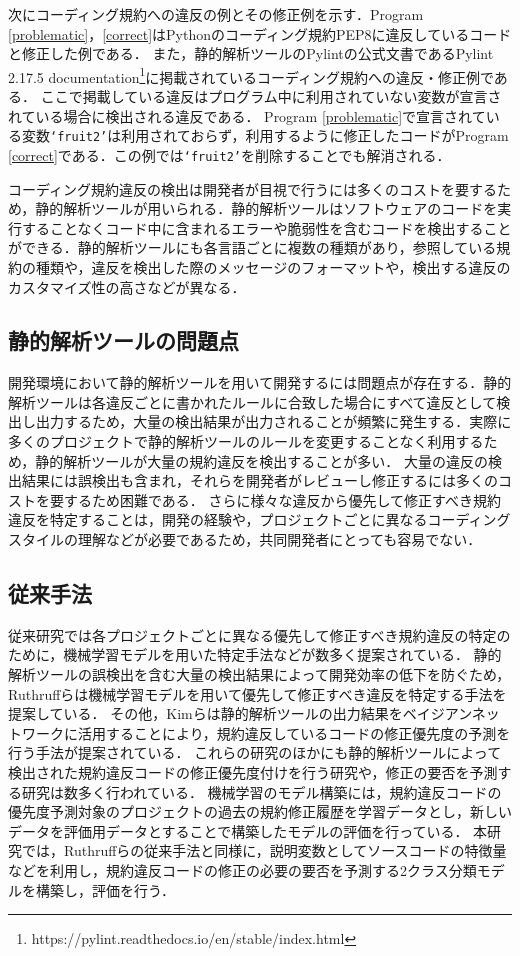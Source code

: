 \documentclass[submit,noauthor,dvipdfmx]{ipsj}
\begin{document}
次にコーディング規約への違反の例とその修正例を示す．Program \ref{problematic}，\ref{correct}はPythonのコーディング規約PEP8に違反しているコードと修正した例である．
また，静的解析ツールのPylintの公式文書であるPylint 2.17.5 documentation\footnote{https://pylint.readthedocs.io/en/stable/index.html}に掲載されているコーディング規約への違反・修正例である．
ここで掲載している違反はプログラム中に利用されていない変数が宣言されている場合に検出される違反である．
Program \ref{problematic}で宣言されている変数\texttt{`fruit2'}は利用されておらず，利用するように修正したコードがProgram \ref{correct}である．この例では\texttt{`fruit2'}を削除することでも解消される．

コーディング規約違反の検出は開発者が目視で行うには多くのコストを要するため，静的解析ツールが用いられる．静的解析ツールはソフトウェアのコードを実行することなくコード中に含まれるエラーや脆弱性を含むコードを検出することができる．静的解析ツールにも各言語ごとに複数の種類があり，参照している規約の種類や，違反を検出した際のメッセージのフォーマットや，検出する違反のカスタマイズ性の高さなどが異なる．

\subsection{静的解析ツールの問題点}

開発環境において静的解析ツールを用いて開発するには問題点が存在する．静的解析ツールは各違反ごとに書かれたルールに合致した場合にすべて違反として検出し出力するため，大量の検出結果が出力されることが頻繁に発生する．実際に多くのプロジェクトで静的解析ツールのルールを変更することなく利用するため，静的解析ツールが大量の規約違反を検出することが多い\cite{UsingStaticAnalysisTools2}．
大量の違反の検出結果には誤検出も含まれ，それらを開発者がレビューし修正するには多くのコストを要するため困難である．
さらに様々な違反から優先して修正すべき規約違反を特定することは，開発の経験や，プロジェクトごとに異なるコーディングスタイルの理解などが必要であるため，共同開発者にとっても容易でない\cite{shuseisarenai}．


\subsection{従来手法}

従来研究では各プロジェクトごとに異なる優先して修正すべき規約違反の特定のために，機械学習モデルを用いた特定手法などが数多く提案されている．
静的解析ツールの誤検出を含む大量の検出結果によって開発効率の低下を防ぐため，Ruthruffらは機械学習モデルを用いて優先して修正すべき違反を特定する手法を提案している\cite{JyuraiPre}．
その他，Kimらは静的解析ツールの出力結果をベイジアンネットワークに活用することにより，規約違反しているコードの修正優先度の予測を行う手法が提案されている\cite{beizu}．
これらの研究のほかにも静的解析ツールによって検出された規約違反コードの修正優先度付けを行う研究や，修正の要否を予測する研究は数多く行われている\cite{Wang}\cite{Qing}\cite{HowFar}．
機械学習のモデル構築には，規約違反コードの優先度予測対象のプロジェクトの過去の規約修正履歴を学習データとし，新しいデータを評価用データとすることで構築したモデルの評価を行っている．
本研究では，Ruthruffらの従来手法と同様に，説明変数としてソースコードの特徴量などを利用し，規約違反コードの修正の必要の要否を予測する2クラス分類モデルを構築し，評価を行う．
\end{document}
